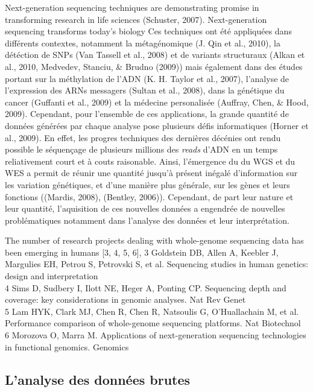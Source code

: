 \documentclass[12pt,twoside]{reedthesis}
\theoremstyle{definition}
\theoremstyle{definition}
\theoremstyle{remark}
\begin{document}
  Next-generation sequencing techniques are demonstrating promise in
  transforming research in life sciences (Schuster, 2007). Next-generation
  sequencing transforms today's biology Ces techniques ont été appliquées
  dans différents contextes, notamment la métagénomique (J. Qin et al.,
  2010), la détéction de SNPs (Van Tassell et al., 2008) et de variants
  structuraux (Alkan et al., 2010, Medvedev, Stanciu, \& Brudno (2009))
  mais également dans des études portant sur la méthylation de l'ADN (K.
  H. Taylor et al., 2007), l'analyse de l'expression des ARNs messagers
  (Sultan et al., 2008), dans la génétique du cancer (Guffanti et al.,
  2009) et la médecine personalisée (Auffray, Chen, \& Hood, 2009).
  Cependant, pour l'ensemble de ces applications, la grande quantité de
  données générées par chaque analyse pose plusieurs défis informatiques
  (Horner et al., 2009). En effet, les progres techniques des dernières
  décénies ont rendu possible le séquençage de plusieurs millions des
  \emph{reads} d'ADN en un temps reliativement court et à couts
  raisonable. Ainsi, l'émergence du du WGS et du WES a permit de réunir
  une quantité jusqu'à présent inégalé d'information sur les variation
  génétiques, et d'une manière plus générale, sur les gènes et leurs
  fonctions ((Mardis, 2008), (Bentley, 2006)). Cependant, de part leur
  nature et leur quantité, l'aquisition de ces nouvelles données a
  engendrée de nouvelles problématiques notamment dans l'analyse des
  données et leur interprétation.
  
  The number of research projects dealing with whole-genome sequencing
  data has been emerging in humans {[}3, 4, 5, 6{]}, 3 Goldstein DB, Allen
  A, Keebler J, Margulies EH, Petrou S, Petrovski S, et al. Sequencing
  studies in human genetics: design and interpretation\\
  4 Sims D, Sudbery I, Ilott NE, Heger A, Ponting CP. Sequencing depth and
  coverage: key considerations in genomic analyses. Nat Rev Genet\\
  5 Lam HYK, Clark MJ, Chen R, Chen R, Natsoulis G, O'Huallachain M, et
  al. Performance comparison of whole-genome sequencing platforms. Nat
  Biotechnol\\
  6 Morozova O, Marra M. Applications of next-generation sequencing
  technologies in functional genomics. Genomics
  
  \subsection{L'analyse des données
  brutes}\label{lanalyse-des-donnees-brutes}
  
\end{document}
